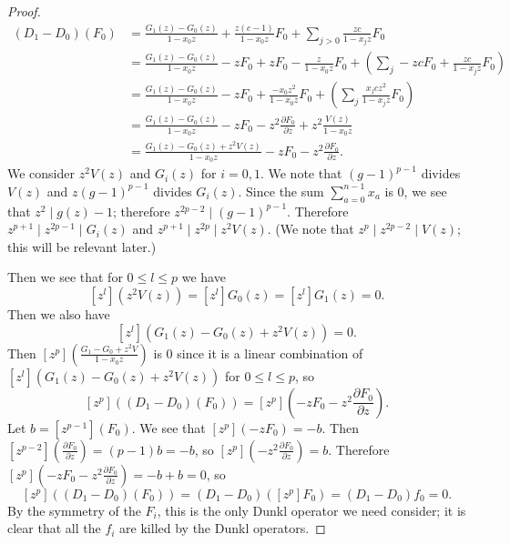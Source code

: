 \documentclass{amsart}
\numberwithin{equation}{section}
\theoremstyle{definition}
\begin{document}
\begin{proof}
\begin{align*}
(D_1-D_0)(F_0)&=\frac{G_1(z)-G_0(z)}{1-x_0z}+\frac{z(c-1)}{1-x_0z}F_0+\sum_{j>0} \frac{zc}{1-x_jz}F_0\\
&=\frac{G_1(z)-G_0(z)}{1-x_0z}-zF_0+zF_0-\frac{z}{1-x_0z}F_0+\left(\sum_{j} -zcF_0+\frac{zc}{1-x_jz}F_0\right)\\
&=\frac{G_1(z)-G_0(z)}{1-x_0z}-zF_0+\frac{-x_0z^2}{1-x_0z}F_0+\left(\sum_{j} \frac{x_jcz^2}{1-x_jz}F_0\right)\\
&=\frac{G_1(z)-G_0(z)}{1-x_0z}-zF_0-z^2\frac{\partial F_0}{\partial z}+z^2\frac{V(z)}{1-x_0z}\\
&=\frac{G_1(z)-G_0(z)+z^2V(z)}{1-x_0z}-zF_0-z^2\frac{\partial F_0}{\partial z}.
\end{align*}
We consider $z^2V(z)$ and $G_i(z)$ for $i=0,1$. We note that $(g-1)^{p-1}$ divides $V(z)$ and $z(g-1)^{p-1}$ divides $G_i(z)$. Since the sum $\sum_{a=0}^{n-1} x_a$ is $0$, we see that $z^2 \mid g(z)-1$; therefore $z^{2p-2} \mid (g-1)^{p-1}$. Therefore $z^{p+1} \mid z^{2p-1} \mid G_i(z)$ and $z^{p+1} \mid z^{2p} \mid z^2V(z)$. (We note that $z^p \mid z^{2p-2} \mid V(z)$; this will be relevant later.)

Then we see that for $0 \le l \le p$ we have
\[
[z^l](z^2V(z))=[z^l]G_0(z)=[z^l]G_1(z)=0.
\]
Then we also have
\[
[z^l](G_1(z)-G_0(z)+z^2V(z))=0.
\]
Then $[z^p]\left(\frac{G_1-G_0+z^2V}{1-x_0z}\right)$ is $0$ since it is a linear combination of $[z^l](G_1(z)-G_0(z)+z^2V(z))$ for $0 \le l \le p$, so 
\[
[z^p]\left((D_1-D_0)(F_0)\right)=[z^p]\left(-zF_0-z^2\frac{\partial F_0}{\partial z}\right).
\]
Let $b=[z^{p-1}](F_0)$. We see that $[z^p](-zF_0)=-b$. Then $[z^{p-2}]\left(\frac{\partial F_0}{\partial z}\right)=(p-1)b=-b$, so $[z^p]\left(-z^2\frac{\partial F_0}{\partial z}\right)=b$. Therefore $[z^p]\left(-zF_0-z^2\frac{\partial F_0}{\partial z}\right)=-b+b=0$, so 
\[
[z^p]((D_1-D_0)(F_0))=(D_1-D_0)([z^p]F_0)=(D_1-D_0)f_0=0.
\]
By the symmetry of the $F_i$, this is the only Dunkl operator we need consider; it is clear that all the $f_i$ are killed by the Dunkl operators.
\end{proof}
\end{document}
